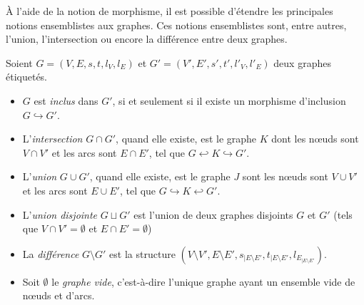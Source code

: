 À l'aide de la notion de morphisme, il est possible d'étendre les principales
notions ensemblistes aux graphes. %
Ces notions ensemblistes sont, entre autres, l'union, l'intersection ou encore
la différence entre deux graphes. %

\begin{definition}
	\label{def:graphe-notions-ensemblistes}
	Soient $G = (V,E,s,t,l_{V},l_{E})$ et $G'=(V',E',s',t',l'_{V},l'_{E})$ deux
	graphes étiquetés. %

	\begin{itemize}
		\item $G$ est  \emph{inclus} dans $G'$, si et seulement si il existe un morphisme d'inclusion $G \hookrightarrow G'$.

		\item L'\emph{intersection} $G \cap G'$, quand elle existe, est le graphe
		      $K$ dont les n\oe uds sont $V \cap V'$ et les arcs sont $E \cap E'$, tel
		      que $G \hookleftarrow K \hookrightarrow G'$.

		\item L'\emph{union} $G \cup G'$, quand elle existe, est le graphe $J$ sont
		      les n\oe uds sont $V \cup V'$ et les arcs sont $E \cup E'$, tel que
		      $G \hookrightarrow K \hookleftarrow G'$.

		\item L'\emph{union disjointe} $G \sqcup G'$ est l'union de deux graphes
		      disjoints $G$ et $G'$ (tels que $V \cap V' = \emptyset$ et
		      $E \cap E' = \emptyset$)
		\item La \emph{différence} $G \setminus G'$ est la structure
		      $(V \setminus V', E \setminus E', s_{|E \setminus E'}, t_{|E \setminus E'}, l_{E_{|E \setminus E'}})$.

		\item Soit $\emptyset$ le \emph{graphe vide}, c'est-à-dire l'unique graphe
		      ayant un ensemble vide de n\oe uds et d'arcs.
	\end{itemize}
\end{definition}

